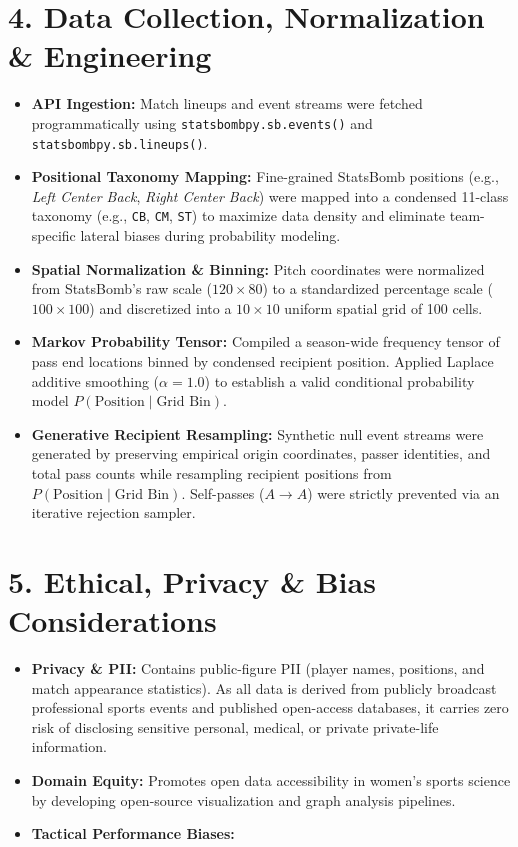 \documentclass[12pt, a4paper]{article}
\begin{document}
\section*{4. Data Collection, Normalization \& Engineering}
\begin{itemize}
    \item \textbf{API Ingestion:} Match lineups and event streams were fetched programmatically using \texttt{statsbombpy.sb.events()} and \texttt{statsbombpy.sb.lineups()}.
    \item \textbf{Positional Taxonomy Mapping:} Fine-grained StatsBomb positions (e.g., \textit{Left Center Back}, \textit{Right Center Back}) were mapped into a condensed 11-class taxonomy (e.g., \texttt{CB}, \texttt{CM}, \texttt{ST}) to maximize data density and eliminate team-specific lateral biases during probability modeling.
    \item \textbf{Spatial Normalization \& Binning:} Pitch coordinates were normalized from StatsBomb's raw scale ($120 \times 80$) to a standardized percentage scale ($100 \times 100$) and discretized into a $10 \times 10$ uniform spatial grid of 100 cells.
    \item \textbf{Markov Probability Tensor:} Compiled a season-wide frequency tensor of pass end locations binned by condensed recipient position. Applied Laplace additive smoothing ($\alpha = 1.0$) to establish a valid conditional probability model $P(\text{Position} \mid \text{Grid Bin})$.
    \item \textbf{Generative Recipient Resampling:} Synthetic null event streams were generated by preserving empirical origin coordinates, passer identities, and total pass counts while resampling recipient positions from $P(\text{Position} \mid \text{Grid Bin})$. Self-passes ($A \to A$) were strictly prevented via an iterative rejection sampler.
\end{itemize}

\section*{5. Ethical, Privacy \& Bias Considerations}
\begin{itemize}
    \item \textbf{Privacy \& PII:} Contains public-figure PII (player names, positions, and match appearance statistics). As all data is derived from publicly broadcast professional sports events and published open-access databases, it carries zero risk of disclosing sensitive personal, medical, or private private-life information.
    \item \textbf{Domain Equity:} Promotes open data accessibility in women's sports science by developing open-source visualization and graph analysis pipelines.
    \item \textbf{Tactical  Performance Biases:}
\end{itemize}
\end{document}
